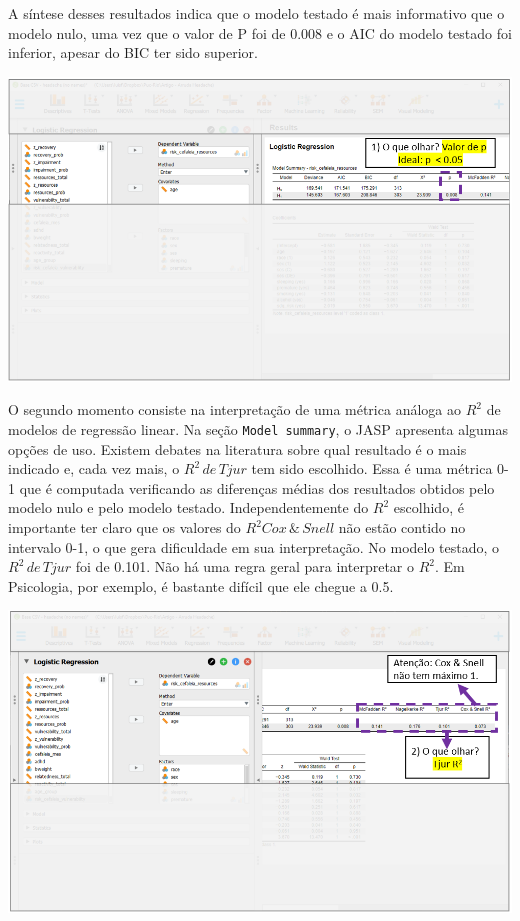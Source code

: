 \documentclass[
]{book}
\begin{document}
A síntese desses resultados indica que o modelo testado é mais
informativo que o modelo nulo, uma vez que o valor de P foi de 0.008 e o
AIC do modelo testado foi inferior, apesar do BIC ter sido superior.

\includegraphics{./img/cap_logistica_resultado_1.png}

O segundo momento consiste na interpretação de uma métrica análoga ao
\(R^2\) de modelos de regressão linear. Na seção
\texttt{Model\ summary}, o JASP apresenta algumas opções de uso. Existem
debates na literatura sobre qual resultado é o mais indicado e, cada vez
mais, o \(R^2 \, de \, Tjur\) tem sido escolhido. Essa é uma métrica 0-1
que é computada verificando as diferenças médias dos resultados obtidos
pelo modelo nulo e pelo modelo testado. Independentemente do \(R^2\)
escolhido, é importante ter claro que os valores do
\(R^2 {Cox\,\& \,Snell}\) não estão contido no intervalo 0-1, o que gera
dificuldade em sua interpretação. No modelo testado, o
\(R^2 \, de \, Tjur\) foi de 0.101. Não há uma regra geral para
interpretar o \(R^2\). Em Psicologia, por exemplo, é bastante difícil
que ele chegue a 0.5.

\includegraphics{./img/cap_logistica_resultado_2.png}
\end{document}

